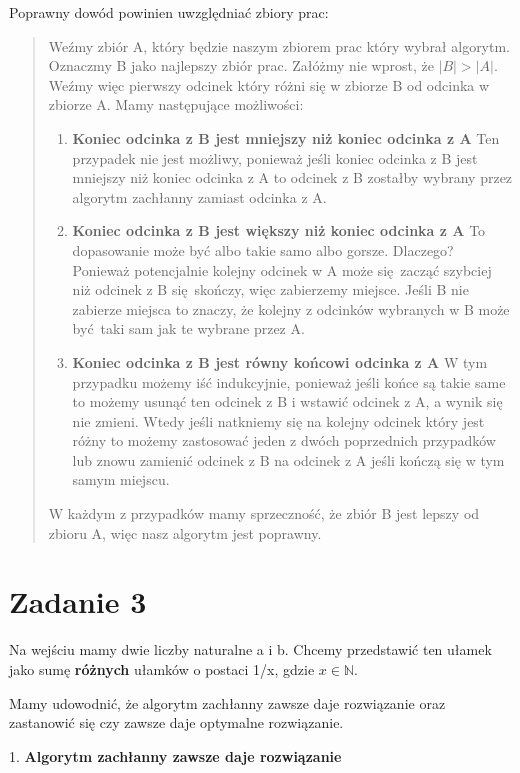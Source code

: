 \documentclass[12pt]{article}
\begin{document}
Poprawny dowód powinien uwzględniać zbiory prac:
\begin{quote}
    Weźmy zbiór A, który będzie naszym zbiorem prac który wybrał algorytm. Oznaczmy B jako najlepszy zbiór prac.
    Załóżmy nie wprost, że $|B| > |A|$. 
    Weźmy więc pierwszy odcinek który różni się w zbiorze B od odcinka w zbiorze A.
    Mamy następujące możliwości:
    \begin{enumerate}
        \item \textbf{Koniec odcinka z B jest mniejszy niż koniec odcinka z A}
        Ten przypadek nie jest możliwy, ponieważ jeśli koniec odcinka z B jest mniejszy niż koniec odcinka z A to odcinek z B zostałby wybrany przez algorytm zachłanny zamiast odcinka z A.
        \item \textbf{Koniec odcinka z B jest większy niż koniec odcinka z A }
        To dopasowanie może być albo takie samo albo gorsze. Dlaczego? Ponieważ potencjalnie kolejny odcinek w A może się zacząć szybciej niż odcinek z B się skończy, więc zabierzemy miejsce. Jeśli B nie zabierze miejsca to znaczy, że kolejny z odcinków wybranych w B może być taki sam jak te wybrane przez A.
        \item \textbf{Koniec odcinka z B jest równy końcowi odcinka z A}
        W tym przypadku możemy iść indukcyjnie, ponieważ jeśli końce są takie same to możemy usunąć ten odcinek z B i wstawić odcinek z A, a wynik się nie zmieni. Wtedy jeśli natkniemy się na kolejny odcinek który jest różny to możemy zastosować jeden z dwóch poprzednich przypadków lub znowu zamienić odcinek z B na odcinek z A jeśli kończą się w tym samym miejscu.
    \end{enumerate}

    W każdym z przypadków mamy sprzeczność, że zbiór B jest lepszy od zbioru A, więc nasz algorytm jest poprawny.
\end{quote}
    
\section{Zadanie 3}

Na wejściu mamy dwie liczby naturalne a i b. 
Chcemy przedstawić ten ułamek jako sumę \textbf{różnych} ułamków o postaci 1/x, gdzie $x \in \mathbb{N}$.

Mamy udowodnić, że algorytm zachłanny zawsze daje rozwiązanie oraz zastanowić się czy zawsze daje optymalne rozwiązanie.

1. \textbf{Algorytm zachłanny zawsze daje rozwiązanie}
\end{document}
